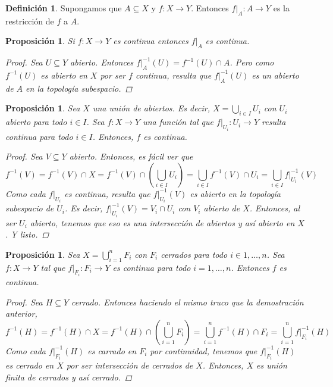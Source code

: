 \documentclass[12pt]{book}
\newtheorem{prop}[teo]{Proposición}
\theoremstyle{definition}
\newtheorem{defn}[teo]{Definición}
\begin{document}
\begin{defn}
Supongamos que $A\subseteq X$ y $f:X\to Y$. Entonces $\left. f\right|_{A}:A\to Y$ es la restricción de $f$ a $A$.
\end{defn}

\begin{prop}
Si $f:X\to Y$ es continua entonces $\left. f\right|_{A}$ es continua.
\begin{proof}
Sea $U\subseteq Y$ abierto. Entonces $\left. f\right|_{A}^{-1}(U) = f^{-1}(U)\cap A$. Pero como $f^{-1}(U)$ es abierto en $X$ por ser $f$ continua, resulta que $\left. f\right|_{A}^{-1}(U)$ es un abierto de $A$ en la topología subespacio.
\end{proof}
\end{prop}

\begin{prop}
Sea $X$ una unión de abiertos. Es decir, $X=\displaystyle\bigcup_{i\in I} U_i$ con $U_i$ abierto para todo $i\in I$. Sea $f:X\to Y$ una función tal que $\left. f\right|_{U_i}:U_i\to Y$ resulta continua para todo $i\in I$. Entonces, $f$ es continua.
\begin{proof}
Sea $V\subseteq Y$ abierto. Entonces, es fácil ver que $$f^{-1}(V) = f^{-1}(V)\cap X = f^{-1}(V)\cap \left(\displaystyle\bigcup_{i\in I}U_i\right) = \displaystyle\bigcup_{i\in I} f^{-1}(V)\cap U_i = \displaystyle\bigcup_{i\in I} \left. f\right|_{U_i}^{-1}(V)$$ Como cada $\left. f\right|_{U_i}$ es continua, resulta que $\left. f\right|_{U_i}^{-1}(V)$ es abierto en la topología subespacio de $U_i$. Es decir, $\left.f\right|_{U_i}^{-1}(V) = V_i \cap U_i$ con $V_i$ abierto de $X$. Entonces, al ser $U_i$ abierto, tenemos que eso es una intersección de abiertos y así abierto en $X$. Y listo.
\end{proof}
\end{prop}

\begin{prop}
Sea $X=\displaystyle\bigcup_{i=1}^n F_i$ con $F_i$ cerrados para todo $i\in 1,\ldots , n$. Sea $f:X\to Y$ tal que $\left. f\right|_{F_i}:F_i\to Y$ es continua para todo $i=1,\ldots ,n$. Entonces $f$ es continua.
\begin{proof}

Sea $H\subseteq Y$ cerrado. Entonces haciendo el mismo truco que la demostración anterior, $$f^{-1}(H) = f^{-1}(H)\cap X = f^{-1}(H)\cap\left(\displaystyle\bigcup_{i=1}^n F_i\right) = \displaystyle\bigcup_{i=1}^n f^{-1}(H)\cap F_i = \displaystyle\bigcup_{i=1}^n \left. f\right|_{F_i}^{-1}(H)$$ Como cada $\left. f\right|_{F_i}^{-1}(H)$ es carrado en $F_i$ por continuidad, tenemos que $\left.f\right|_{F_i}^{-1}(H)$ es cerrado en $X$ por ser intersección de cerrados de $X$. Entonces, $X$ es unión finita de cerrados y así cerrado.

\end{proof}
\end{prop}
\end{document}

